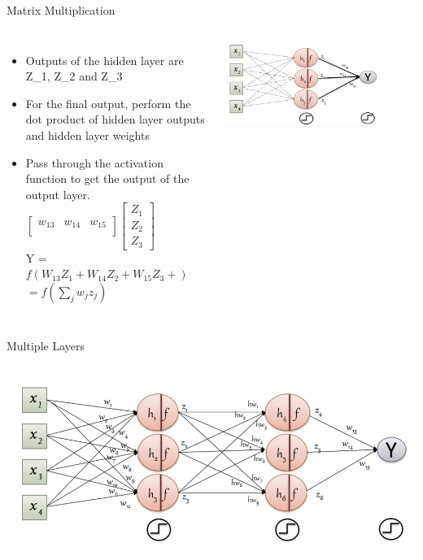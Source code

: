 \documentclass[aspectratio=169,13pt,usenames,dvipsnames]{beamer}
\begin{document}
\begin{frame}{ Matrix Multiplication }
\begin{columns}
\begin{itemize}
  \item Outputs of the hidden layer are Z\_{1}, Z\_{2} and Z\_{3} \\
  \item For the final output, perform the dot product of hidden layer outputs and hidden layer weights \\
  \item Pass through the activation function to get the output of the output layer.\\
  	{$ \begin{bmatrix}
 	w_{13} & w_{14} & w_{15} \\
	\end{bmatrix}
	\begin{bmatrix}
 	Z_{1}\\
 	Z_{2}\\
 	Z_{3}
	\end{bmatrix}$}\\
  	Y = {$ f(W_{13}Z_{1} + W_{14}Z_{2} + W_{15}Z_{3} +) $}
            {$ = f\left ( \sum_{j}^{} w_{j}z_{j}\right )$}
  
\end{itemize}
\includegraphics[width=0.8\textwidth, height=0.6\textheight]{Images/AIML_MLP_IMG6.jpg}
\end{columns}
\end{frame}


\begin{frame}{Multiple Layers}
\begin{columns}
\includegraphics[width=1.0\textwidth, height=0.6\textheight]{Images/AIML_MLP_IMG7.jpg}
\end{columns}
\end{frame}
\end{document}
